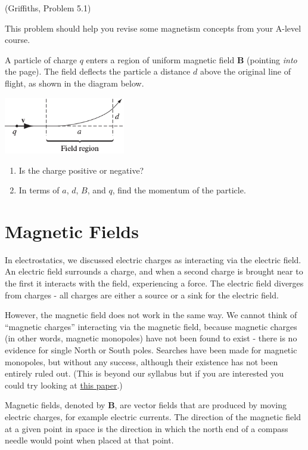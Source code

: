 \documentclass[
  letterpaper,
  DIV=11,
  numbers=noendperiod]{scrreprt}
\begin{document}
(Griffiths, Problem 5.1)

This problem should help you revise some magnetism concepts from your
A-level course.

A particle of charge \(q\) enters a region of uniform magnetic field
\(\mathrm{\mathbf{B}}\) (pointing \emph{into} the page). The field
deflects the particle a distance \(d\) above the original line of
flight, as shown in the diagram below.

\includegraphics[width=2.08333in,height=\textheight]{Figures/L4_preprob.png}

\begin{enumerate}
\def\labelenumi{(\alph{enumi})}
\item
  Is the charge positive or negative?
\item
  In terms of \(a\), \(d\), \(B\), and \(q\), find the momentum of the
  particle.
\end{enumerate}

\section{Magnetic Fields}\label{magnetic-fields}

In electrostatics, we discussed electric charges as interacting via the
electric field. An electric field surrounds a charge, and when a second
charge is brought near to the first it interacts with the field,
experiencing a force. The electric field diverges from charges - all
charges are either a source or a sink for the electric field.

However, the magnetic field does not work in the same way. We cannot
think of ``magnetic charges'' interacting via the magnetic field,
because magnetic charges (in other words, magnetic monopoles) have not
been found to exist - there is no evidence for single North or South
poles. Searches have been made for magnetic monopoles, but without any
success, although their existence has not been entirely ruled out. (This
is beyond our syllabus but if you are interested you could try looking
at
\href{https://royalsocietypublishing.org/doi/10.1098/rsta.2018.0328}{this
paper}.)

Magnetic fields, denoted by \(\mathrm{\mathbf{B}}\), are vector fields
that are produced by moving electric charges, for example electric
currents. The direction of the magnetic field at a given point in space
is the direction in which the north end of a compass needle would point
when placed at that point.
\end{document}

